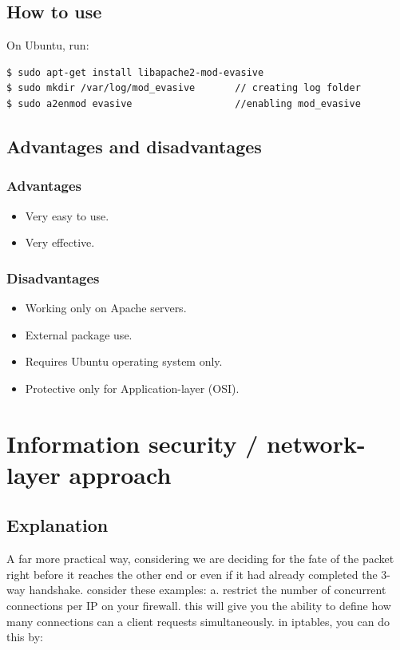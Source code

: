 \documentclass{report}
\begin{document}
\subsection {How to use}
On Ubuntu, run:
\begin{lstlisting}[frame=single]
$ sudo apt-get install libapache2-mod-evasive
$ sudo mkdir /var/log/mod_evasive       // creating log folder
$ sudo a2enmod evasive                  //enabling mod_evasive
\end{lstlisting}

\subsection {Advantages and disadvantages }
\subsubsection{Advantages} 
\begin{itemize}
\item Very easy to use.
\item Very effective.
\end{itemize}
\subsubsection{Disadvantages}
\begin{itemize}
\item Working only on Apache servers.
\item External package use.
\item Requires Ubuntu operating system only.
\item Protective only for Application-layer (OSI).
\end{itemize}
\newpage
\section {Information security / network-layer approach}

\subsection {Explanation}
A far more practical way, considering we are deciding for the fate of the packet right before it reaches the other end or even if it had already completed the 3-way handshake. consider these examples:\hfill \break
a. restrict the number of concurrent connections per IP on your firewall. this will give you the ability to define how many connections can a client requests simultaneously.
in iptables, you can do this by:
\hfill \break
\end{document}
